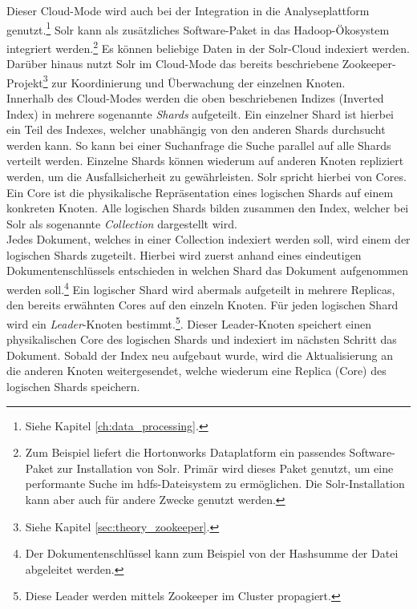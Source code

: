 \noindent
Dieser Cloud-Mode wird auch bei der Integration in die Analyseplattform genutzt.\footnote{Siehe Kapitel \ref{ch:data_processing}.} Solr kann als zusätzliches Software-Paket in das Hadoop-Ökosystem integriert werden.\footnote{Zum Beispiel liefert die Hortonworks Dataplatform ein passendes Software-Paket zur Installation von Solr. Primär wird dieses Paket genutzt, um eine performante Suche im \gls{hdfs}-Dateisystem zu ermöglichen. Die Solr-Installation kann aber auch für andere Zwecke genutzt werden.} Es können beliebige Daten in der Solr-Cloud indexiert werden. Darüber hinaus nutzt Solr im Cloud-Mode das bereits beschriebene Zookeeper-Projekt\footnote{Siehe Kapitel \ref{sec:theory_zookeeper}.} zur Koordinierung und Überwachung der einzelnen Knoten.\\
Innerhalb des Cloud-Modes werden die oben beschriebenen Indizes (Inverted Index) in mehrere sogenannte \textit{Shards} aufgeteilt. Ein einzelner Shard ist hierbei ein Teil des Indexes, welcher unabhängig von den anderen Shards durchsucht werden kann. So kann bei einer Suchanfrage die Suche parallel auf alle Shards verteilt werden. Einzelne Shards können wiederum auf anderen Knoten repliziert werden, um die Ausfallsicherheit zu gewährleisten. Solr spricht hierbei von Cores. Ein Core ist die physikalische Repräsentation eines logischen Shards auf einem konkreten Knoten. Alle logischen Shards bilden zusammen den Index, welcher bei Solr als sogenannte \textit{Collection} dargestellt wird.\cite{solr_cloud_scaling}\\

\noindent
Jedes Dokument, welches in einer Collection indexiert werden soll, wird einem der logischen Shards zugeteilt. Hierbei wird zuerst anhand eines eindeutigen Dokumentenschlüssels entschieden in welchen Shard das Dokument aufgenommen werden soll.\footnote{Der Dokumentenschlüssel kann zum Beispiel von der Hashsumme der Datei abgeleitet werden.} Ein logischer Shard wird abermals aufgeteilt in mehrere Replicas, den bereits erwähnten Cores auf den einzeln Knoten. Für jeden logischen Shard wird ein \textit{Leader}-Knoten bestimmt.\footnote{Diese Leader werden mittels Zookeeper im Cluster propagiert.}. Dieser Leader-Knoten speichert einen physikalischen Core des logischen Shards und indexiert im nächsten Schritt das Dokument. Sobald der Index neu aufgebaut wurde, wird die Aktualisierung an die anderen Knoten weitergesendet, welche wiederum eine Replica (Core) des logischen Shards speichern.\cite[S. 867 ff]{solr_ref_guide}\\ 


